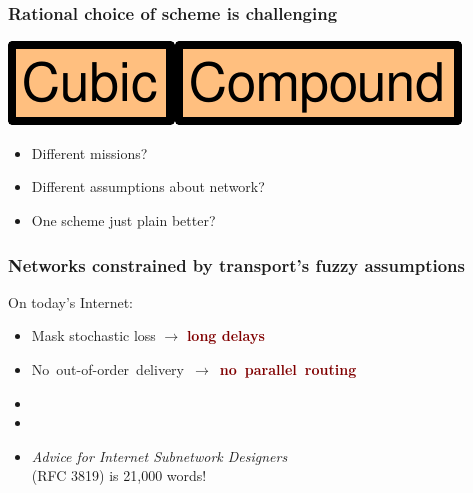 \documentclass[svgnames]{beamer}
\newcommand{\ssline}{\vspace{8 pt}}
\begin{document}
\begin{frame}
\frametitle{Rational choice of scheme is challenging}

\begin{centering}
\includegraphics[height=20 pt]{cubic.pdf}\hspace{8 pt}{\bf vs.}\hspace{8 pt}\includegraphics[height=20 pt]{compound.pdf}

\end{centering}

\ssline
\ssline
\ssline

\begin{itemize}

\Large

\item Different missions?

\item Different assumptions about network?

\item One scheme just plain better?

\end{itemize}

\end{frame}

\begin{frame}
\frametitle{Networks constrained by transport's fuzzy assumptions}

\Large

On today's Internet:

\begin{itemize}
\item Mask stochastic loss $\rightarrow$ {\bf \textcolor{Maroon}{long delays}}
\item \mbox{No out-of-order delivery $\rightarrow$ {\bf \textcolor{Maroon}{no parallel routing}}}
\item[]
\item[]
\item[] {\it Advice for Internet Subnetwork Designers}\\ (RFC 3819) is 21,000 words!
\end{itemize}

\end{frame}
\end{document}
